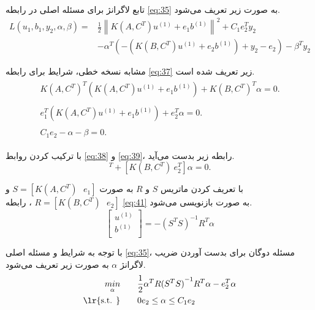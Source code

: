 تابع لاگرانژ برای مسئله اصلی در رابطه \ref{eq:35} به صورت زیر تعریف می‌شود.
\begin{equation}
\begin{split}
L(u_{1},b_{1},y_{2}, \alpha, \beta )= & \frac{1}{2}{{\left\| K(A, C^{T}){{u}^{(1)}}+{{e}_{1}}{{b}^{(1)}} \right\|}^{2}} + {{C}_{1}}e_{2}^{T}y_{2} \\
&-\alpha^{T}(-(K(B, C^{T})u^{(1)}+e_{2}b^{(1)})+y_{2} - e_{2}) - \beta^{T}y_{2}
\end{split}
\label{eq:37}
\end{equation}

مشابه نسخه خطی، شرایط  برای رابطه \ref{eq:37} زیر تعریف شده است.
\begin{align}
\label{eq:38}
\begin{split}
K(A, C^{T})^{T}(K(A,C^{T}){{u}^{(1)}}+{{e}_{1}}{{b}^{(1)}}) + K(B, C^{T})^{T}\alpha = 0.
\end{split} \\
\label{eq:39}
\begin{split}
e_{1}^{T}(K(A,C^{T}){{u}^{(1)}}+{{e}_{1}}{{b}^{(1)}}) + e_{2}^{T}\alpha = 0.
\end{split}\\
\label{eq:40}
\begin{split}
C_{1}e_{2} - \alpha - \beta = 0.
\end{split} 
\end{align}

با ترکیب کردن روابط \ref{eq:38} و \ref{eq:39}، رابطه زیر بدست می‌آید.
\begin{equation}
[K(A,C^{T})^{T}\ e^{T}_{1}][K(A,C^{T})\ e_{1}][u^{(1)}\ b^{(1)}]^{T} + [K(B, C^{T})\ e^{T}_{2}]\alpha = 0.
\label{eq:41}
\end{equation}

با تعریف کردن ماتریس $S$ و $R$  به صورت $S=[K(A,C^{T})\text{ }e_{1}]$ و $R=[K(B,C^{T})\text{ }e_{2}]$ ، رابطه \ref{eq:41} به صورت بازنویسی می‌شود.
\begin{equation}
\left[ \begin{matrix}
{{u}^{(1)}} \\
{{b}^{(1)}} \\
\end{matrix}\right]= -{{({{S}^{T}}S)}^{-1}}{{R}^{T}}\alpha
\label{eq:42}
\end{equation}

با توجه به شرایط  و مسئله اصلی \ref{eq:35}، مسئله دوگان برای بدست آوردن ضریب لاگرانژ $\alpha$ به صورت زیر تعریف می‌شود.
\begin{equation}
\begin{split}
\mathop{{ min}}\limits_{\alpha} \qquad & \frac{1}{2}{{\alpha }^{T}}R{{({{S}^{T}}S)}^{-1}}{{R}^{T}}\alpha -e_{2}^{T}\alpha  \\
\textrm{\lr{s.t. }} \qquad & 0{{e}_{2}}\le \alpha \le {{C}_{1}}{{e}_{2}}
\end{split}
\label{eq:43}
\end{equation}

